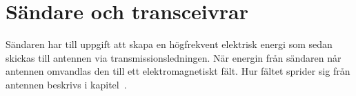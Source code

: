\chapter{Sändare och transceivrar}
\label{ch:saendare}
\label{ch:transceiver}

Sändaren har till uppgift att skapa en högfrekvent elektrisk energi som sedan
skickas till antennen via transmissionsledningen.
När energin från sändaren når antennen omvandlas den till ett elektromagnetiskt
fält.
Hur fältet sprider sig från antennen beskrivs i
kapitel~.
